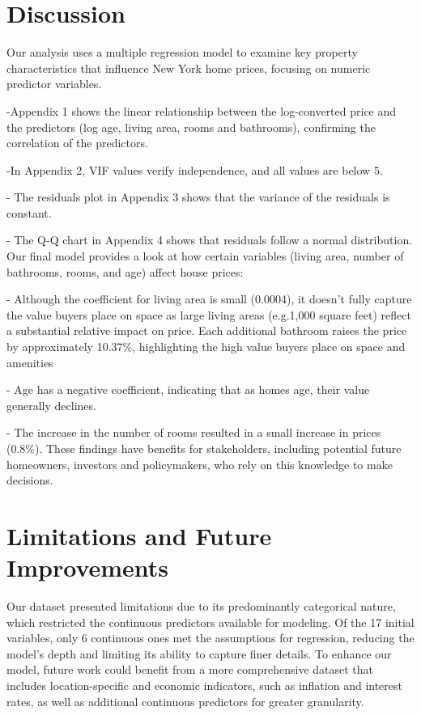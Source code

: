 \documentclass[
  twocolumn]{article}
\begin{document}
\section{Discussion}\label{discussion}

Our analysis uses a multiple regression model to examine key property
characteristics that influence New York home prices, focusing on numeric
predictor variables.

-Appendix 1 shows the linear relationship between the log-converted
price and the predictors (log age, living area, rooms and bathrooms),
confirming the correlation of the predictors.

-In Appendix 2, VIF values verify independence, and all values are below
5.

- The residuals plot in Appendix 3 shows that the variance of the
residuals is constant.

- The Q-Q chart in Appendix 4 shows that residuals follow a normal
distribution. Our final model provides a look at how certain variables
(living area, number of bathrooms, rooms, and age) affect house prices:

- Although the coefficient for living area is small (0.0004), it doesn't
fully capture the value buyers place on space as large living areas
(e.g.1,000 square feet) reflect a substantial relative impact on price.
Each additional bathroom raises the price by approximately 10.37\%,
highlighting the high value buyers place on space and amenities

- Age has a negative coefficient, indicating that as homes age, their
value generally declines.

- The increase in the number of rooms resulted in a small increase in
prices (0.8\%). These findings have benefits for stakeholders, including
potential future homeowners, investors and policymakers, who rely on
this knowledge to make decisions.

\section{Limitations and Future
Improvements}\label{limitations-and-future-improvements}

Our dataset presented limitations due to its predominantly categorical
nature, which restricted the continuous predictors available for
modeling. Of the 17 initial variables, only 6 continuous ones met the
assumptions for regression, reducing the model's depth and limiting its
ability to capture finer details. To enhance our model, future work
could benefit from a more comprehensive dataset that includes
location-specific and economic indicators, such as inflation and
interest rates, as well as additional continuous predictors for greater
granularity.
\end{document}
